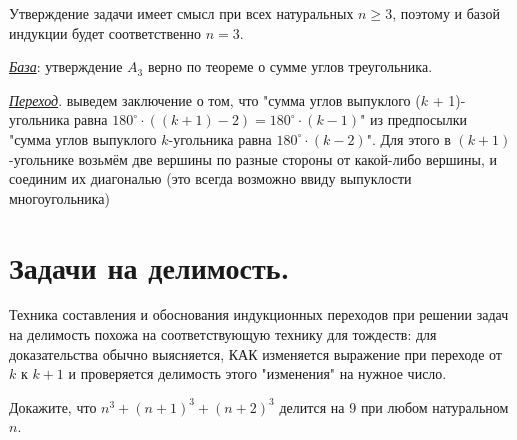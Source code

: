 \begin{prf}
Утверждение задачи имеет смысл при всех натуральных $n \geq 3$, поэтому и базой индукции будет соответственно $n = 3$.
\par
\textit{\underline{База}}: утверждение $A_3$ верно по теореме о сумме углов треугольника.
\par
\textit{\underline{Переход}}. выведем заключение о том, что "сумма углов выпуклого ($k$ + 1)-угольника равна $180 ^{\circ} \cdot ((k + 1) - 2) = 180 ^{\circ} \cdot (k -1)$" из предпосылки "сумма углов выпуклого $k$-угольника равна $180 ^{\circ} \cdot (k - 2)$". Для этого в $(k + 1)$-угольнике возьмём две вершины по разные стороны от какой-либо вершины, и соединим их диагональю (это всегда возможно ввиду выпуклости многоугольника)\footnotemark
\end{prf}
    
\section{Задачи на делимость.}

Техника составления и обоснования индукционных переходов при решении задач на делимость похожа на соответствующую технику для тождеств: для доказательства обычно выясняется, КАК изменяется выражение при переходе от $k$ к $k + 1$ и проверяется делимость этого "изменения" на нужное число.

\begin{thm}
Докажите, что $n^3 + (n + 1)^3 + (n+2)^3$ делится на 9 при любом натуральном $n$.
\end{thm}

